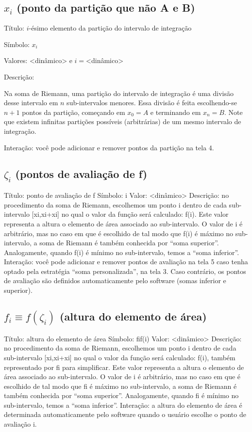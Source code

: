 \documentclass[a4paper,10pt]{scrartcl}
\begin{document}
  \subsection{$x_i$ (ponto da partição que não A e B)}
    \begin{compactdesc}
      \item{Título:} $i$-ésimo elemento da partição do intervalo de integração
      \item{Símbolo:} $x_i$
      \item{Valores:} <dinâmico> e $i = $<dinâmico>
      \item{Descrição:}\par
      Na soma de Riemann, uma partição do intervalo de integração é uma divisão desse intervalo em $n$ sub-intervalos menores. Essa divisão é feita escolhendo-se $n+1$ pontos da partição, começando em $x_0 = A$ e terminando em $x_n = B$. Note que existem infinitas partições possíveis (arbitrárias) de um mesmo intervalo de integração.
      \item{Interação:} você pode adicionar e remover pontos da partição na tela 4.
    \end{compactdesc}

  \subsection*{$\zeta_i$ (pontos de avaliação de f)}
	Título: ponto de avaliação de f
	Símbolo: i
	Valor: <dinâmico>
	Descrição: no procedimento da soma de Riemann, escolhemos um ponto i dentro de cada sub-intervalo [xi,xi+xi] no qual o valor da função será calculado: f(i). Este valor representa a altura o elemento de área associado ao sub-intervalo. O valor de i é arbitrário, mas no caso em que é escolhido de tal modo que f(i) é máximo no sub-intervalo, a soma de Riemann é também conhecida por “soma superior”. Analogamente, quando f(i) é mínimo no sub-intervalo, temos a “soma inferior”.
	Interação: você pode adicionar e remover pontos de avaliação na tela 5 caso tenha optado pela estratégia “soma personalizada”, na tela 3. Caso contrário, os pontos de avaliação são definidos automaticamente pelo software (somas inferior e superior).
	
  \subsection*{$f_i\equiv f(\zeta_i)$ (altura do elemento de área)}
	Título: altura do elemento de área
	Símbolo: fif(i)
	Valor: <dinâmico>
	Descrição: no procedimento da soma de Riemann, escolhemos um ponto i dentro de cada sub-intervalo [xi,xi+xi] no qual o valor da função será calculado: f(i), também representado por fi para simplificar. Este valor representa a altura o elemento de área associado ao sub-intervalo. O valor de i é arbitrário, mas no caso em que é escolhido de tal modo que fi é máximo no sub-intervalo, a soma de Riemann é também conhecida por “soma superior”. Analogamente, quando fi é mínimo no sub-intervalo, temos a “soma inferior”.
	Interação: a altura do elemento de área é determinada automaticamente pelo software quando o usuário escolhe o ponto de avaliação i.
\end{document}
